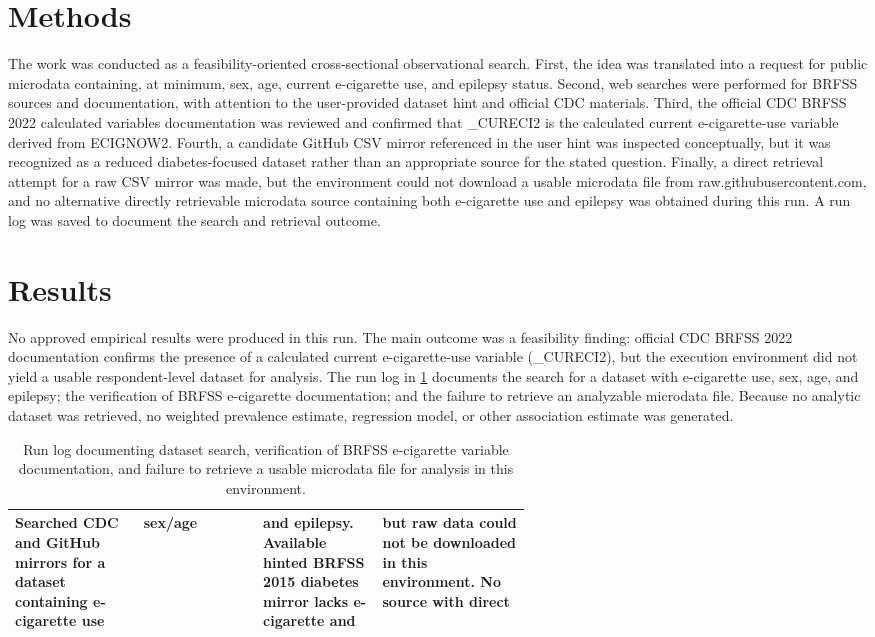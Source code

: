 \documentclass[11pt]{article}
\begin{document}
\section{Methods}
The work was conducted as a feasibility-oriented cross-sectional observational search. First, the idea was translated into a request for public microdata containing, at minimum, sex, age, current e-cigarette use, and epilepsy status. Second, web searches were performed for BRFSS sources and documentation, with attention to the user-provided dataset hint and official CDC materials. Third, the official CDC BRFSS 2022 calculated variables documentation was reviewed and confirmed that \_CURECI2 is the calculated current e-cigarette-use variable derived from ECIGNOW2. Fourth, a candidate GitHub CSV mirror referenced in the user hint was inspected conceptually, but it was recognized as a reduced diabetes-focused dataset rather than an appropriate source for the stated question. Finally, a direct retrieval attempt for a raw CSV mirror was made, but the environment could not download a usable microdata file from raw.githubusercontent.com, and no alternative directly retrievable microdata source containing both e-cigarette use and epilepsy was obtained during this run. A run log was saved to document the search and retrieval outcome. \cite{ref1} \cite{ref2} \cite{ref3}

\section{Results}
No approved empirical results were produced in this run. The main outcome was a feasibility finding: official CDC BRFSS 2022 documentation confirms the presence of a calculated current e-cigarette-use variable (\_CURECI2), but the execution environment did not yield a usable respondent-level dataset for analysis. The run log in \ref{tab:artifact-1} documents the search for a dataset with e-cigarette use, sex, age, and epilepsy; the verification of BRFSS e-cigarette documentation; and the failure to retrieve an analyzable microdata file. Because no analytic dataset was retrieved, no weighted prevalence estimate, regression model, or other association estimate was generated.

\begin{table}[tbp]
\centering
\caption{Run log documenting dataset search, verification of BRFSS e-cigarette variable documentation, and failure to retrieve a usable microdata file for analysis in this environment.}
\label{tab:artifact-1}
\begin{tabular}{>{\raggedright\arraybackslash}p{0.15\linewidth}>{\raggedright\arraybackslash}p{0.15\linewidth}>{\raggedright\arraybackslash}p{0.15\linewidth}>{\raggedright\arraybackslash}p{0.15\linewidth}}
\toprule
Searched CDC and GitHub mirrors for a dataset containing e-cigarette use & sex/age & and epilepsy. Available hinted BRFSS 2015 diabetes mirror lacks e-cigarette and  & but raw data could not be downloaded in this environment. No source with direct  \\
\midrule
\bottomrule
\end{tabular}
\end{table}
\end{document}
